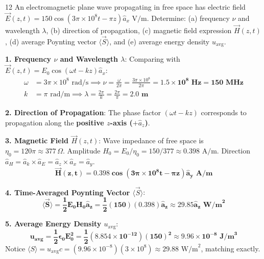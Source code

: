 \begin{theoryq}{12}
An electromagnetic plane wave propagating in free space has electric field $\vec{E}(z,t) = 150 \cos(3\pi \times 10^8 t - \pi z)\hat{a}_x\text{ V/m}$. Determine: (a) frequency $\nu$ and wavelength $\lambda$, (b) direction of propagation, (c) magnetic field expression $\vec{H}(z,t)$, (d) average Poynting vector $\langle \vec{S} \rangle$, and (e) average energy density $u_{\text{avg}}$.
\end{theoryq}
\begin{theorysol}
\textbf{1. Frequency $\nu$ and Wavelength $\lambda$}:
Comparing with $\vec{E}(z,t) = E_0 \cos(\omega t - kz)\hat{a}_x$:
\begin{align*}
\omega &= 3\pi \times 10^8\text{ rad/s} \implies \nu = \frac{\omega}{2\pi} = \frac{3\pi \times 10^8}{2\pi} = \mathbf{1.5 \times 10^8\text{ Hz} = 150\text{ MHz}} \\
k &= \pi\text{ rad/m} \implies \lambda = \frac{2\pi}{k} = \frac{2\pi}{\pi} = \mathbf{2.0\text{ m}}
\end{align*}

\textbf{2. Direction of Propagation}:
The phase factor $(\omega t - kz)$ corresponds to propagation along the \textbf{positive $z$-axis ($+\hat{a}_z$)}.

\textbf{3. Magnetic Field $\vec{H}(z,t)$}:
Wave impedance of free space is $\eta_0 = 120\pi \approx 377\,\Omega$.
Amplitude $H_0 = E_0 / \eta_0 = 150 / 377 \approx 0.398\text{ A/m}$.
Direction $\hat{a}_H = \hat{a}_k \times \hat{a}_E = \hat{a}_z \times \hat{a}_x = \hat{a}_y$.
\begin{equation}
\mathbf{\vec{H}(z,t) = 0.398 \cos(3\pi \times 10^8 t - \pi z)\hat{a}_y\text{ A/m}}
\end{equation}

\textbf{4. Time-Averaged Poynting Vector $\langle \vec{S} \rangle$}:
\begin{equation}
\mathbf{\langle \vec{S} \rangle = \frac{1}{2} E_0 H_0 \hat{a}_z = \frac{1}{2}(150)(0.398)\hat{a}_z \approx 29.85\hat{a}_z\text{ W/m}^2}
\end{equation}

\textbf{5. Average Energy Density $u_{\text{avg}}$}:
\begin{equation}
\mathbf{u_{\text{avg}} = \frac{1}{2}\epsilon_0 E_0^2 = \frac{1}{2}(8.854 \times 10^{-12})(150)^2 \approx 9.96 \times 10^{-8}\text{ J/m}^3}
\end{equation}
Notice $\langle S \rangle = u_{\text{avg}} c = (9.96 \times 10^{-8})(3 \times 10^8) \approx 29.88\text{ W/m}^2$, matching exactly.
\end{theorysol}
\vspace{4mm}

